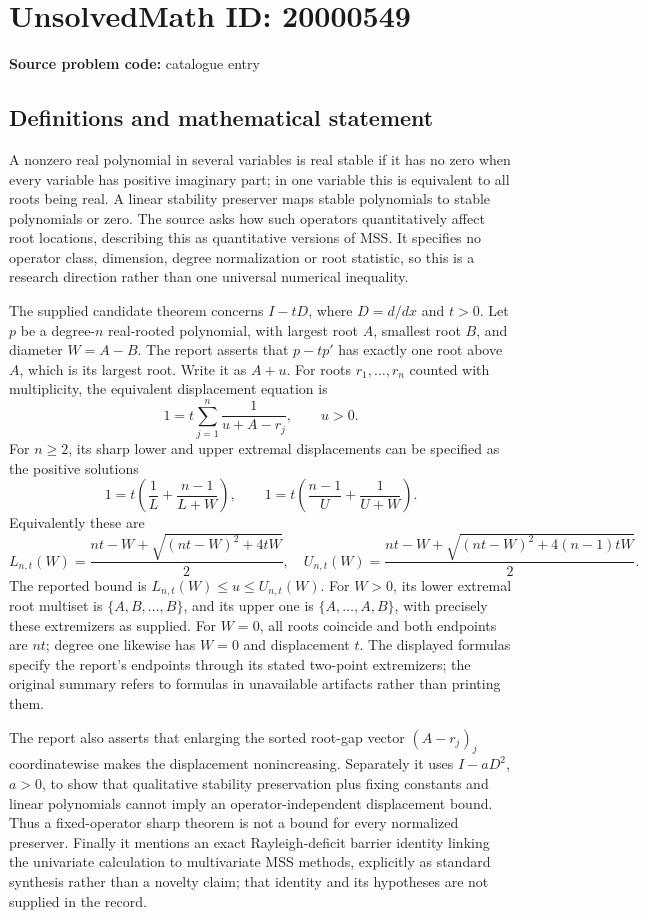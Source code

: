 \documentclass[11pt]{article}
\begin{document}
\section*{UnsolvedMath ID: 20000549}
\textbf{Source problem code:} catalogue entry
\subsection{Definitions and mathematical statement}
A nonzero real polynomial in several variables is real stable if it has no zero when every variable has positive imaginary part; in one variable this is equivalent to all roots being real. A linear stability preserver maps stable polynomials to stable polynomials or zero. The source asks how such operators quantitatively affect root locations, describing this as quantitative versions of MSS. It specifies no operator class, dimension, degree normalization or root statistic, so this is a research direction rather than one universal numerical inequality.

The supplied candidate theorem concerns \(I-tD\), where \(D=d/dx\) and \(t>0\). Let \(p\) be a degree-\(n\) real-rooted polynomial, with largest root \(A\), smallest root \(B\), and diameter \(W=A-B\). The report asserts that \(p-tp'\) has exactly one root above \(A\), which is its largest root. Write it as \(A+u\). For roots \(r_1,\ldots,r_n\) counted with multiplicity, the equivalent displacement equation is
\[
 1=t\sum_{j=1}^n\frac1{u+A-r_j},\qquad u>0.
\]
For \(n\ge2\), its sharp lower and upper extremal displacements can be specified as the positive solutions
\[
 1=t\left(\frac1L+\frac{n-1}{L+W}\right),\qquad
 1=t\left(\frac{n-1}U+\frac1{U+W}\right).
\]
Equivalently these are
\[
 L_{n,t}(W)=\frac{nt-W+\sqrt{(nt-W)^2+4tW}}2,
 \quad
 U_{n,t}(W)=\frac{nt-W+\sqrt{(nt-W)^2+4(n-1)tW}}2.
\]
The reported bound is \(L_{n,t}(W)\le u\le U_{n,t}(W)\). For \(W>0\), its lower extremal root multiset is \(\{A,B,\ldots,B\}\), and its upper one is \(\{A,\ldots,A,B\}\), with precisely these extremizers as supplied. For \(W=0\), all roots coincide and both endpoints are \(nt\); degree one likewise has \(W=0\) and displacement \(t\). The displayed formulas specify the report's endpoints through its stated two-point extremizers; the original summary refers to formulas in unavailable artifacts rather than printing them.

The report also asserts that enlarging the sorted root-gap vector \((A-r_j)_j\) coordinatewise makes the displacement nonincreasing. Separately it uses \(I-aD^2\), \(a>0\), to show that qualitative stability preservation plus fixing constants and linear polynomials cannot imply an operator-independent displacement bound. Thus a fixed-operator sharp theorem is not a bound for every normalized preserver. Finally it mentions an exact Rayleigh-deficit barrier identity linking the univariate calculation to multivariate MSS methods, explicitly as standard synthesis rather than a novelty claim; that identity and its hypotheses are not supplied in the record.
\end{document}
